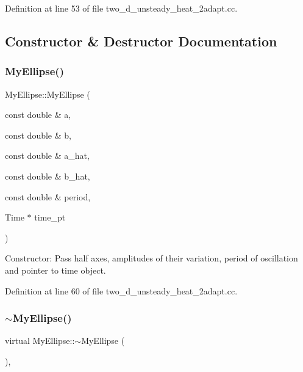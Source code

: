 Definition at line 53 of file two\+\_\+d\+\_\+unsteady\+\_\+heat\+\_\+2adapt.\+cc.



\subsection{Constructor \& Destructor Documentation}
\mbox{\label{classMyEllipse_aaa00984813af171e611e420eb3433653}} 
\subsubsection{\texorpdfstring{My\+Ellipse()}{MyEllipse()}}
{\footnotesize\ttfamily My\+Ellipse\+::\+My\+Ellipse (\begin{DoxyParamCaption}\item[{const double \&}]{a,  }\item[{const double \&}]{b,  }\item[{const double \&}]{a\+\_\+hat,  }\item[{const double \&}]{b\+\_\+hat,  }\item[{const double \&}]{period,  }\item[{Time $\ast$}]{time\+\_\+pt }\end{DoxyParamCaption})\hspace{0.3cm}{\ttfamily [inline]}}



Constructor\+: Pass half axes, amplitudes of their variation, period of oscillation and pointer to time object. 



Definition at line 60 of file two\+\_\+d\+\_\+unsteady\+\_\+heat\+\_\+2adapt.\+cc.

\mbox{\label{classMyEllipse_ac2f2d3fb269c57fb26b4db6d9a0c7c05}} 
\subsubsection{\texorpdfstring{$\sim$\+My\+Ellipse()}{~MyEllipse()}}
{\footnotesize\ttfamily virtual My\+Ellipse\+::$\sim$\+My\+Ellipse (\begin{DoxyParamCaption}{ }\end{DoxyParamCaption})\hspace{0.3cm}{\ttfamily [inline]}, {\ttfamily [virtual]}}



